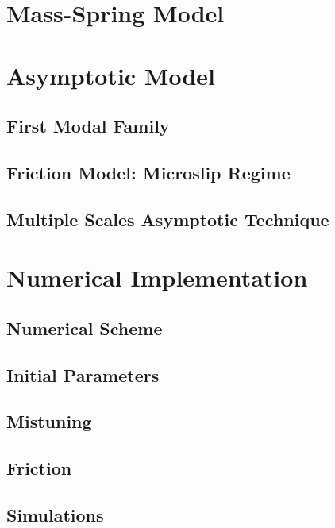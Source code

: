 
\section{Mass-Spring Model}


\section{Asymptotic Model}


\subsection{First Modal Family}


\subsection{Friction Model: Microslip Regime}


\subsection{Multiple Scales Asymptotic Technique}

\section{Numerical Implementation}


\subsection{Numerical Scheme}


\subsection{Initial Parameters}


\subsection{Mistuning}


\subsection{Friction}


\subsection{Simulations}








